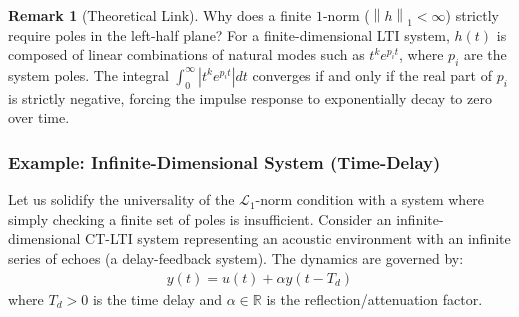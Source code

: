 \documentclass[11pt, a4paper, twoside]{article}
\newcommand{\norm}[1]{\left\lVert#1\right\rVert}
\newcommand{\abs}[1]{\left\lvert#1\right\rvert}
\theoremstyle{plain}
\theoremstyle{definition}
\newtheorem{remark}[theorem]{Remark}
\begin{document}
\begin{remark}[Theoretical Link]
Why does a finite $1$-norm ($\norm{h}_1 < \infty$) strictly require poles in the left-half plane? For a finite-dimensional LTI system, $h(t)$ is composed of linear combinations of natural modes such as $t^k e^{p_i t}$, where $p_i$ are the system poles. The integral $\int_0^\infty \abs{t^k e^{p_i t}} dt$ converges if and only if the real part of $p_i$ is strictly negative, forcing the impulse response to exponentially decay to zero over time.
\end{remark}

\subsubsection*{Example: Infinite-Dimensional System (Time-Delay)}

Let us solidify the universality of the $\mathcal{L}_1$-norm condition with a system where simply checking a finite set of poles is insufficient. Consider an infinite-dimensional CT-LTI system representing an acoustic environment with an infinite series of echoes (a delay-feedback system). The dynamics are governed by:
%
\begin{align*}
    y(t) = u(t) + \alpha y(t - T_d)
\end{align*}
%
where $T_d > 0$ is the time delay and $\alpha \in \mathbb{R}$ is the reflection/attenuation factor. 
\end{document}
